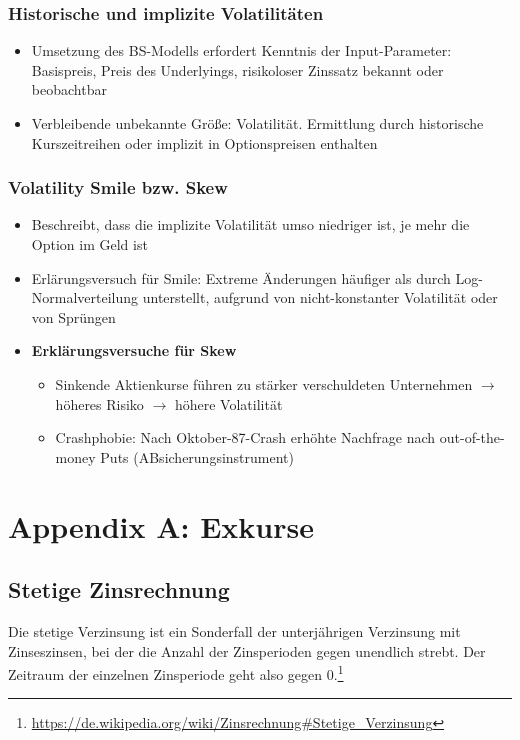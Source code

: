 \subsubsection{Historische und implizite Volatilitäten}
\begin{itemize}
	\item Umsetzung des BS-Modells erfordert Kenntnis der Input-Parameter: Basispreis, Preis des Underlyings, risikoloser Zinssatz bekannt oder beobachtbar
	\item Verbleibende unbekannte Größe: Volatilität. Ermittlung durch historische Kurszeitreihen oder implizit in Optionspreisen enthalten
\end{itemize}

\subsubsection{Volatility Smile bzw. Skew}
\begin{itemize}
	\item Beschreibt, dass die implizite Volatilität umso niedriger ist, je mehr die Option im Geld ist
	\item Erlärungsversuch für Smile: Extreme Änderungen häufiger als durch Log-Normalverteilung unterstellt, aufgrund von nicht-konstanter Volatilität oder von Sprüngen 
	\item \textbf{Erklärungsversuche für Skew}
	\begin{itemize}
		\item Sinkende Aktienkurse führen zu stärker verschuldeten Unternehmen \(\rightarrow\) höheres Risiko \(\rightarrow\) höhere Volatilität
		\item Crashphobie: Nach Oktober-87-Crash erhöhte Nachfrage nach out-of-the-money Puts (ABsicherungsinstrument)
	\end{itemize}
\end{itemize}



\section{Appendix A: Exkurse}

\subsection{Stetige Zinsrechnung}

Die stetige Verzinsung ist ein Sonderfall der unterjährigen Verzinsung mit Zinseszinsen, bei der die Anzahl der Zinsperioden gegen unendlich strebt. Der Zeitraum der einzelnen Zinsperiode geht also gegen \(0\).\footnote{\url{https://de.wikipedia.org/wiki/Zinsrechnung\#Stetige_Verzinsung}}

